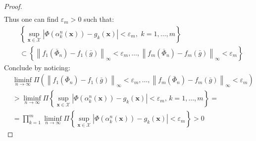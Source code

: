 \begin{proof}
$$\begin{aligned}
\end{aligned}
$$
Thus one can find $\varepsilon_m>0$ such that:
$$
\begin{aligned}
& \left\{\sup_{\boldsymbol{x} \in \mathcal{X}}\left|\Phi\left(\alpha_k^n(\boldsymbol{x})\right)-g_k(\boldsymbol{x})\right| <\varepsilon_m, \, \, k=1, \ldots, m\right\} \\
& \subset \left\{\left\|f_1\left(\bar{\Phi}_n\right)-f_1(\bar{g})\right\|_{\infty}<\varepsilon_m, \ldots , \left\|f_m\left(\bar{\Phi}_n\right)-f_m(\bar{g})\right\|_{\infty}<\varepsilon_m\right\}
\end{aligned}
$$
Conclude by noticing:
$$
\begin{aligned}
& \liminf_{n \rightarrow \infty} \Pi \left(\left\|f_1\left(\bar{\Phi}_n\right)-f_1(\bar{g})\right\|_{\infty}<\varepsilon_m, \ldots,\left\|f_m\left(\bar{\Phi}_n\right)-f_m(\bar{g})\right\|_{\infty}<\varepsilon_m\right)\\
& > \liminf_{n \rightarrow \infty} \Pi\left\{\sup_{\boldsymbol{x} \in \mathcal{X}}\left|\Phi\left(\alpha_k^n(\boldsymbol{x})\right)-g_k(\boldsymbol{x})\right| <\varepsilon_m, \, k = 1, \ldots, m\right\}= \\
& =\prod_{k=1}^m \liminf_{n \rightarrow \infty}  \Pi \left\{\sup_{\boldsymbol{x} \in \mathcal{X}}\left|\Phi\left(\alpha_k^n(\boldsymbol{x})\right)-g_k(\boldsymbol{x})\right| <\varepsilon_m\right\}>0
\end{aligned}
$$
\end{proof}

